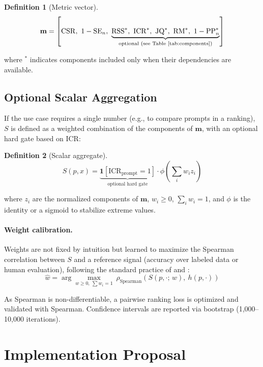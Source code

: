 \documentclass[11pt,a4paper]{article}
\newtheorem{definition}{Definition}
\begin{document}
\begin{definition}[Metric vector]
\[
\mathbf{m} = \left[\mathrm{CSR},\ 1 - \mathrm{SE}_n,\ \underbrace{\mathrm{RSS}^*,\ \mathrm{ICR}^*,\ \mathrm{JQ}^*,\ \mathrm{RM}^*,\ 1 - \mathrm{PP}_n^*}_{\text{optional (see Table~\ref{tab:components})}}\right]
\]
\end{definition}

\noindent where ${}^*$ indicates components included only when their dependencies are available.

\subsection{Optional Scalar Aggregation}

If the use case requires a single number (e.g., to compare prompts in a ranking), $S$ is defined as a weighted combination of the components of $\mathbf{m}$, with an optional hard gate based on ICR:

\begin{definition}[Scalar aggregate]
\[
S(p, x) = \underbrace{\mathbf{1}\left[\mathrm{ICR}_\mathrm{prompt} = 1\right]}_{\text{optional hard gate}} \cdot \phi\!\left(\sum_{i} w_i z_i\right)
\]
\end{definition}

\noindent where $z_i$ are the normalized components of $\mathbf{m}$, $w_i \geq 0$, $\sum_i w_i = 1$, and $\phi$ is the identity or a sigmoid to stabilize extreme values.

\paragraph{Weight calibration.}
Weights are not fixed by intuition but learned to maximize the Spearman correlation between $S$ and a reference signal (accuracy over labeled data or human evaluation), following the standard practice of \citet{glape2024} and \citet{geval2023}:
\[
\hat{w} = \arg\max_{w \geq 0,\ \sum w_i = 1}\ \rho_\mathrm{Spearman}\!\left(S(p, \cdot;\, w),\ h(p, \cdot)\right)
\]

As Spearman is non-differentiable, a pairwise ranking loss is optimized and validated with Spearman. Confidence intervals are reported via bootstrap (1{,}000--10{,}000 iterations).

\section{Implementation Proposal}
\end{document}
